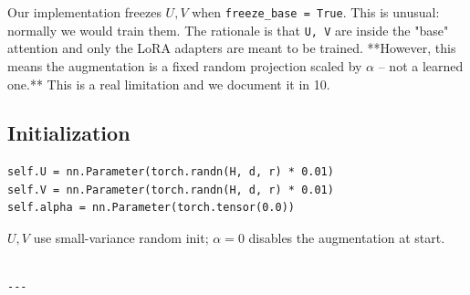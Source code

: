 Our implementation freezes $U, V$ when \texttt{freeze\_base = True}. This is 
unusual: normally we would train them. The rationale is that \texttt{U, V} are 
inside the "base" attention and only the LoRA adapters are meant to be 
trained. **However, this means the augmentation is a fixed random projection 
scaled by $\alpha$ -- not a learned one.** This is a real limitation and we 
document it in  10.

\subsection{Initialization}

\begin{lstlisting}
self.U = nn.Parameter(torch.randn(H, d, r) * 0.01)
self.V = nn.Parameter(torch.randn(H, d, r) * 0.01)
self.alpha = nn.Parameter(torch.tensor(0.0))
\end{lstlisting}

$U, V$ use small-variance random init; $\alpha = 0$ disables the 
augmentation at start.
\begin{lstlisting}

---
\end{lstlisting}